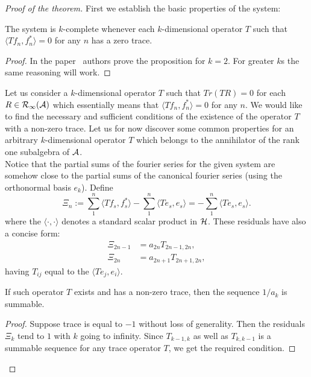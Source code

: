     \begin{proof}[Proof of the theorem]
        First we establish the basic properties of the system:
        \begin{prop}
            The system is $k$-complete whenever each $k$-dimensional operator $T$ 
            such that $\langle Tf_n, f_n^* \rangle = 0$ for any $n$ has a zero trace.
        \end{prop}
        \begin{proof}
            In the paper~\cite{katavolos} authors prove the proposition for $k = 2$. For greater $k$s the same reasoning will work.
        \end{proof}
        Let us consider a $k$-dimensional operator $T$ such that 
        $Tr(TR) = 0$ for each $R \in \cal{R}_1(\cal{A})$ which essentially means that
        $\langle Tf_n, f_n^* \rangle = 0$ for any $n$. 
        We would like to find the necessary and sufficient conditions of the existence of the operator $T$ with a non-zero trace.
        Let us for now discover some common properties for an arbitrary $k$-dimensional operator $T$ which belongs to the annihilator of the rank one subalgebra of $\cal{A}$.\\
        Notice that the partial sums of the fourier series for the given system are somehow close to the
        partial sums of the canonical fourier series (using the orthonormal basis $e_k$). Define
        $$
          \Xi_n := \sum_1^n \langle Tf_s, f_s^* \rangle - \sum_1^n \langle Te_s, e_s \rangle = -\sum_1^n \langle Te_s, e_s \rangle.
        $$
        where the $\langle \cdot, \cdot\rangle$ denotes a standard scalar product in $\cal{H}$. 
        These residuals have also a concise form:
        \begin{align*}
            \Xi_{2n-1} &= a_{2n}T_{2n - 1, 2n},\\
            \Xi_{2n} &= a_{2n + 1}T_{2n + 1, 2n},
        \end{align*}
        having $T_{ij}$ equal to the $\langle Te_j, e_i \rangle$.
        \begin{remark}
            If such operator $T$ exists and has a non-zero trace, then the sequence $1/a_k$ is summable.
        \end{remark}
        \begin{proof}
            Suppose trace is equal to $-1$ without loss of generality.
            Then the residuals $\Xi_k$ tend to $1$ with $k$ going to infinity. Since $T_{k-1, k}$ as well as $T_{k, k-1}$
            is a summable sequence for any trace operator $T$, we get the required condition.

\end{proof}
\end{proof}
